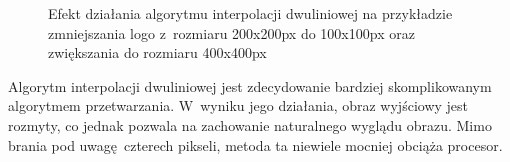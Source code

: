\begin{figure}[h]
    \centering
    \qquad
    \qquad
    \caption{Efekt działania algorytmu interpolacji dwuliniowej na przykładzie zmniejszania logo \bk z~rozmiaru 200x200px do 100x100px oraz zwiększania do rozmiaru 400x400px}
    \label{fig:bilinear-result}
\end{figure}

Algorytm interpolacji dwuliniowej jest zdecydowanie bardziej skomplikowanym algorytmem przetwarzania. W~wyniku jego działania, obraz wyjściowy jest rozmyty, co jednak pozwala na zachowanie naturalnego wyglądu obrazu. Mimo brania pod uwagę czterech pikseli, metoda ta niewiele mocniej obciąża procesor. 

